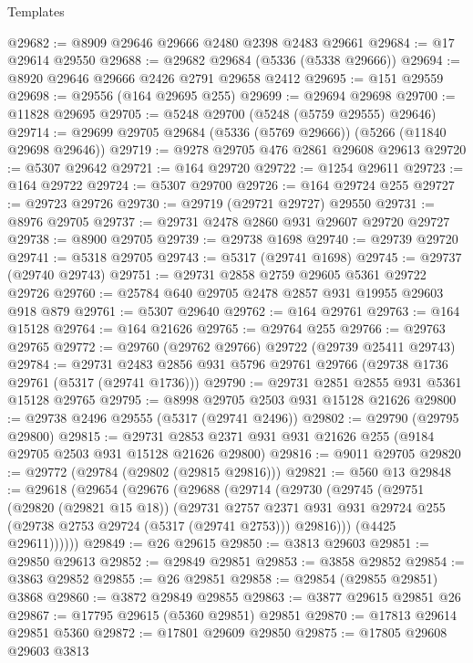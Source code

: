 \begin{lexlean}{Templates}
\begin{coremodule}
@29682 := @8909 @29646 @29666 @2480 @2398 @2483 @29661
@29684 := @17 @29614 @29550
@29688 := @29682 @29684 (@5336 (@5338 @29666))
@29694 := @8920 @29646 @29666 @2426 @2791 @29658 @2412
@29695 := @151 @29559
@29698 := @29556 (@164 @29695 @255)
@29699 := @29694 @29698
@29700 := @11828 @29695
@29705 := @5248 @29700 (@5248 (@5759 @29555) @29646)
@29714 := @29699 @29705 @29684 (@5336 (@5769 @29666)) (@5266 (@11840 @29698 @29646))
@29719 := @9278 @29705 @476 @2861 @29608 @29613
@29720 := @5307 @29642
@29721 := @164 @29720
@29722 := @1254 @29611
@29723 := @164 @29722
@29724 := @5307 @29700
@29726 := @164 @29724 @255
@29727 := @29723 @29726
@29730 := @29719 (@29721 @29727) @29550
@29731 := @8976 @29705
@29737 := @29731 @2478 @2860 @931 @29607 @29720 @29727
@29738 := @8900 @29705
@29739 := @29738 @1698
@29740 := @29739 @29720
@29741 := @5318 @29705
@29743 := @5317 (@29741 @1698)
@29745 := @29737 (@29740 @29743)
@29751 := @29731 @2858 @2759 @29605 @5361 @29722 @29726
@29760 := @25784 @640 @29705 @2478 @2857 @931 @19955 @29603 @918 @879
@29761 := @5307 @29640
@29762 := @164 @29761
@29763 := @164 @15128
@29764 := @164 @21626
@29765 := @29764 @255
@29766 := @29763 @29765
@29772 := @29760 (@29762 @29766) @29722 (@29739 @25411 @29743)
@29784 := @29731 @2483 @2856 @931 @5796 @29761 @29766 (@29738 @1736 @29761 (@5317 (@29741 @1736)))
@29790 := @29731 @2851 @2855 @931 @5361 @15128 @29765
@29795 := @8998 @29705 @2503 @931 @15128 @21626
@29800 := @29738 @2496 @29555 (@5317 (@29741 @2496))
@29802 := @29790 (@29795 @29800)
@29815 := @29731 @2853 @2371 @931 @931 @21626 @255 (@9184 @29705 @2503 @931 @15128 @21626 @29800)
@29816 := @9011 @29705
@29820 := @29772 (@29784 (@29802 (@29815 @29816)))
@29821 := @560 @13
@29848 := @29618
    (@29654
      (@29676
        (@29688
          (@29714
            (@29730
              (@29745
                (@29751
                  (@29820 (@29821 @15 @18))
                  (@29731
                    @2757
                    @2371
                    @931
                    @931
                    @29724
                    @255
                    (@29738 @2753 @29724 (@5317 (@29741 @2753)))
                    @29816)))
              (@4425 @29611))))))
@29849 := @26 @29615
@29850 := @3813 @29603
@29851 := @29850 @29613
@29852 := @29849 @29851
@29853 := @3858 @29852
@29854 := @3863 @29852
@29855 := @26 @29851
@29858 := @29854 (@29855 @29851) @3868
@29860 := @3872 @29849 @29855
@29863 := @3877 @29615 @29851 @26
@29867 := @17795 @29615 (@5360 @29851) @29851
@29870 := @17813 @29614 @29851 @5360
@29872 := @17801 @29609 @29850
@29875 := @17805 @29608 @29603 @3813

\end{coremodule}
\end{lexlean}
